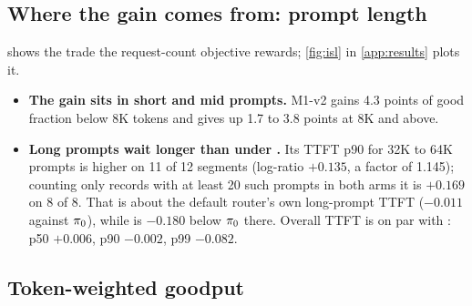 \subsection{Where the gain comes from: prompt length}
\label{sec:gaming-isl}

\begin{table}[tbp]
  \centering
  \caption{Good fraction and TTFT by prompt length on test (descriptive, computed after the test
    pass from its records). Good-fraction differences in percentage points, with the number
    of segments on which M1-v2 is higher; TTFT p90 as a segment-mean log-ratio.}
  \label{tab:isl}
  
\end{table}

 shows the trade the request-count objective rewards; \cref{fig:isl} in
\cref{app:results} plots it.
\begin{itemize}
  \item \textbf{The gain sits in short and mid prompts.} M1-v2 gains 4.3 points of good fraction
    below 8K tokens and gives up 1.7 to 3.8 points at 8K and above.
  \item \textbf{Long prompts wait longer than under .} Its TTFT p90 for 32K to 64K
    prompts is higher on 11 of 12 segments (log-ratio $+0.135$, a factor of 1.145); counting only
    records with at least 20 such prompts in both arms it is $+0.169$ on 8 of 8. That is about the
    default router's own long-prompt TTFT ($-0.011$ against $\pi_{0}$), while  is
    $-0.180$ below $\pi_{0}$ there. Overall TTFT is on par with : p50 $+0.006$, p90
    $-0.002$, p99 $-0.082$.
\end{itemize}

\subsection{Token-weighted goodput}
\label{sec:a19}

